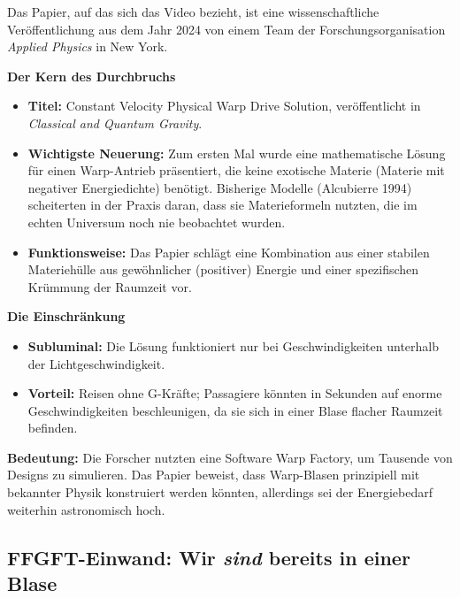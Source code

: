 \begin{geminibox}
Das Papier, auf das sich das Video bezieht, ist eine wissenschaftliche Ver\"offentlichung aus dem Jahr 2024 von einem Team der Forschungsorganisation \emph{Applied Physics} in New York.

\textbf{Der Kern des Durchbruchs}
\begin{itemize}[leftmargin=1.2em]
  \item \textbf{Titel:} \glqq Constant Velocity Physical Warp Drive Solution\grqq, ver\"offentlicht in \emph{Classical and Quantum Gravity}.
  \item \textbf{Wichtigste Neuerung:} Zum ersten Mal wurde eine mathematische L\"osung f\"ur einen Warp-Antrieb pr\"asentiert, die keine \glqq exotische Materie\grqq{} (Materie mit negativer Energiedichte) ben\"otigt. Bisherige Modelle (Alcubierre 1994) scheiterten in der Praxis daran, dass sie Materieformeln nutzten, die im echten Universum noch nie beobachtet wurden.
  \item \textbf{Funktionsweise:} Das Papier schl\"agt eine Kombination aus einer stabilen Materieh\"ulle aus gew\"ohnlicher (positiver) Energie und einer spezifischen Kr\"ummung der Raumzeit vor.
\end{itemize}

\textbf{Die Einschr\"ankung}
\begin{itemize}[leftmargin=1.2em]
  \item \textbf{Subluminal:} Die L\"osung funktioniert nur bei Geschwindigkeiten unterhalb der Lichtgeschwindigkeit.
  \item \textbf{Vorteil:} Reisen ohne G-Kr\"afte; Passagiere k\"onnten in Sekunden auf enorme Geschwindigkeiten beschleunigen, da sie sich in einer Blase flacher Raumzeit befinden.
\end{itemize}

\textbf{Bedeutung:} Die Forscher nutzten eine Software \glqq Warp Factory\grqq, um Tausende von Designs zu simulieren. Das Papier beweist, dass Warp-Blasen prinzipiell mit bekannter Physik konstruiert werden k\"onnten, allerdings sei der Energiebedarf weiterhin astronomisch hoch.
\end{geminibox}

\subsection{FFGFT-Einwand: Wir \emph{sind} bereits in einer Blase}

